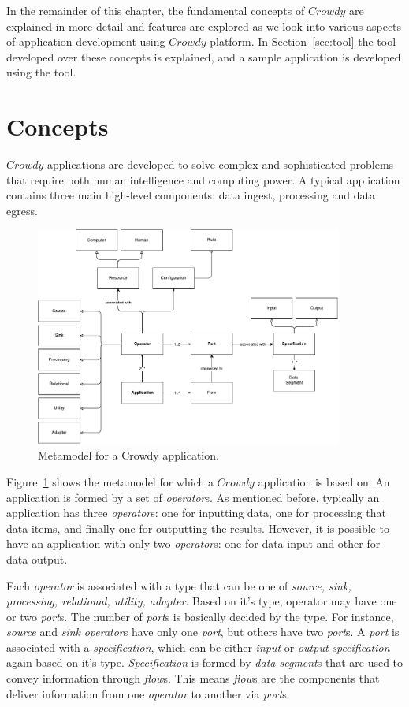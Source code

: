 In the remainder of this chapter, the fundamental concepts of $Crowdy$ are explained 
in more detail and features are explored as we look into various aspects of application 
development using $Crowdy$ platform. In Section~\ref{sec:tool} the tool developed over 
these concepts is explained, and a sample application is developed using the tool.

\section{Concepts}

$Crowdy$ applications are developed to solve complex and sophisticated problems 
that require both human intelligence and computing power. A typical application contains 
three main high-level components: data ingest, processing and data egress.

\begin{figure}[ht]
	\centering
	\includegraphics[width=0.9\textwidth]{figures/ApplicationMetamodel.pdf}
	\caption{Metamodel for a Crowdy application.}
	\label{fig:metamodel}
\end{figure}

Figure~\ref{fig:metamodel} shows the metamodel for which a $Crowdy$ application is 
based on. An application is formed by a set of \textit{operator}s. As mentioned before, 
typically an application has three \textit{operator}s: one for inputting data, one for processing 
that data items, and finally one for outputting the results. However, it is possible to 
have an application with only two \textit{operator}s: one for data input and other for data 
output.

Each \textit{operator} is associated with a type that can be one of \textit{source, sink, 
processing, relational, utility, adapter}. Based on it's type, operator may have 
one or two \textit{port}s. The number of \textit{port}s is basically decided by the type. 
For instance, \textit{source} and \textit{sink} \textit{operator}s have only one \textit{port}, 
but others have two \textit{port}s. A \textit{port} is associated with a \textit{specification}, 
which can be either \textit{input} or \textit{output} \textit{specification} again based on 
it's type. \textit{Specification} is formed by \textit{data segment}s that are used to 
convey information through \textit{flow}s. This means \textit{flow}s are the 
components that deliver information from one \textit{operator} to another via \textit{port}s.

